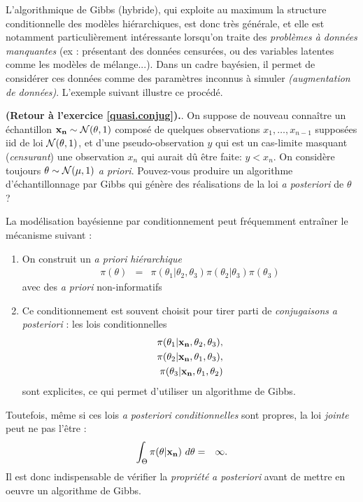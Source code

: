 L'algorithmique de Gibbs (hybride), qui exploite au maximum la structure conditionnelle des modèles hiérarchiques, est donc très générale, et elle est notamment particulièrement intéressante lorsqu'on traite des \emph{problèmes à données manquantes} (ex : présentant des données censurées, ou des variables latentes comme les modèles de mélange...). Dans un cadre bayésien, il permet de considérer ces données comme des paramètres inconnus à simuler {\it ({augmentation de données})}. L'exemple suivant illustre ce procédé. 

\begin{exec}{\bf (Retour à l'exercice \ref{quasi.conjug}).}. 
 On suppose de nouveau connaître un échantillon ${\bf x_n} \sim {\cal{N}}(\theta,1)$ composé de quelques observations $x_1,\ldots,x_{n-1}$ supposées iid de loi ${\cal{N}}(\theta,1)$, et d'une  pseudo-observation $y$ qui est un cas-limite masquant ({\it censurant}) une observation $x_{n}$ qui aurait dû être faite: $y<x_{n}$. On considère toujours $\theta \sim {\cal{N}}(\mu,1)$ {\it a priori}. 
Pouvez-vous produire un algorithme d'échantillonnage par Gibbs qui génère des réalisations de la loi {\it a posteriori} de $\theta$ ? 
\end{exec}

\if{} \vspace{1cm} 
\fi
\vspace{0.5cm}

La modélisation bayésienne par conditionnement peut fréquemment entra\^iner le mécanisme suivant : 
\begin{enumerate}
\item On construit un {\it a priori} \emph{hiérarchique}
\begin{eqnarray*}
\pi(\theta) & = & \pi(\theta_1|\theta_2,\theta_3)\pi(\theta_2|\theta_3)\pi(\theta_3)
\end{eqnarray*}
avec des {\it a priori} non-informatifs
\item Ce conditionnement est souvent choisit pour tirer parti de \emph{conjugaisons} {\it a posteriori} : les lois conditionnelles
\begin{eqnarray*}
\pi(\theta_1|{\bf x_n},\theta_2,\theta_3), \\
\pi(\theta_2|{\bf x_n},\theta_1,\theta_3), \\
\pi(\theta_3|{\bf x_n},\theta_1,\theta_2)
\end{eqnarray*}
sont explicites, ce qui permet d'utiliser un algorithme de Gibbs.
\end{enumerate}
Toutefois,  même si ces lois {\it a posteriori} \emph{conditionnelles}  sont propres, la loi \emph{jointe} peut ne pas l'être :
\begin{eqnarray*}
\int_{\Theta} \pi(\theta|{\bf x_n}) \ d\theta & = & \infty.
\end{eqnarray*}
Il est donc indispensable de vérifier la \emph{propriété} {\it a posteriori} avant de mettre en oeuvre un algorithme de Gibbs. 



